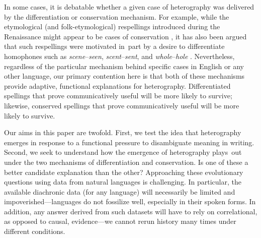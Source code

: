 \documentclass[doc,biblatex]{apa7}
\begin{document}
In some cases, it is debatable whether a given case of heterography was delivered by the differentiation or conservation mechanism. For example, while the etymological (and folk-etymological) respellings introduced during the Renaissance might appear to be cases of conservation \parencite[the most notorious example being the replacement of <dout> with <doubt> to indicate the word's Latin derivation from \textit{dubitare};][p.~268]{Crystal:2005}, it has also been argued that such respellings were motivated in~part by a desire to differentiate homophones such as \textit{scene}--\textit{seen}, \textit{scent}--\textit{sent}, and \textit{whole}--\textit{hole} \parencite[pp.~58--59]{Scragg:1974}. Nevertheless, regardless of the particular mechanism behind specific cases in English or any other language, our primary contention here is that both of these mechanisms provide adaptive, functional explanations for heterography. Differentiated spellings that prove communicatively useful will be more likely to survive; likewise, conserved spellings that prove communicatively useful will be more likely to survive.

Our aims in this paper are twofold. First, we test the idea that heterography emerges in response to a functional pressure to disambiguate meaning in writing. Second, we seek to understand how the emergence of heterography plays~out under the two mechanisms of differentiation and conservation. Is one of these a better candidate explanation than the other? Approaching these evolutionary questions using data from natural languages is challenging. In particular, the available diachronic data (for any language) will necessarily be limited and impoverished---languages do not fossilize well, especially in their spoken forms. In addition, any answer derived from such datasets will have to rely on correlational, as opposed to causal, evidence---we cannot rerun history many times under different conditions.
\end{document}
